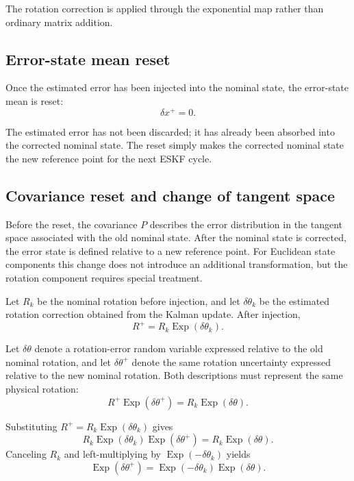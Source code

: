 \documentclass[11pt]{article}
\numberwithin{equation}{section}
\newcommand{\Exp}{\operatorname{Exp}}
\begin{document}
The rotation correction is applied through the exponential map rather
than ordinary matrix addition.

\subsection{Error-state mean reset}

Once the estimated error has been injected into the nominal state, the
error-state mean is reset:
\begin{equation}
\boxed{
\delta x^+=0.
}
\end{equation}

The estimated error has not been discarded; it has already been
absorbed into the corrected nominal state.  The reset simply makes the
corrected nominal state the new reference point for the next ESKF
cycle.

\subsection{Covariance reset and change of tangent space}

Before the reset, the covariance $P$ describes the error distribution
in the tangent space associated with the old nominal state.  After the
nominal state is corrected, the error state is defined relative to a
new reference point.  For Euclidean state components this change does
not introduce an additional transformation, but the rotation component
requires special treatment.

Let $R_k$ be the nominal rotation before injection, and let
$\delta\theta_k$ be the estimated rotation correction obtained from the
Kalman update.  After injection,
\begin{equation}
\boxed{
R^+
=
R_k\Exp(\delta\theta_k).
}
\end{equation}

Let $\delta\theta$ denote a rotation-error random variable expressed
relative to the old nominal rotation, and let $\delta\theta^+$ denote
the same rotation uncertainty expressed relative to the new nominal
rotation.  Both descriptions must represent the same physical
rotation:
\begin{equation}
\boxed{
R^+\Exp(\delta\theta^+)
=
R_k\Exp(\delta\theta).
}
\end{equation}

Substituting $R^+=R_k\Exp(\delta\theta_k)$ gives
\[
R_k\Exp(\delta\theta_k)\Exp(\delta\theta^+)
=
R_k\Exp(\delta\theta).
\]
Canceling $R_k$ and left-multiplying by
$\Exp(-\delta\theta_k)$ yields
\begin{equation}
\boxed{
\Exp(\delta\theta^+)
=
\Exp(-\delta\theta_k)\Exp(\delta\theta).
}
\end{equation}
\end{document}

